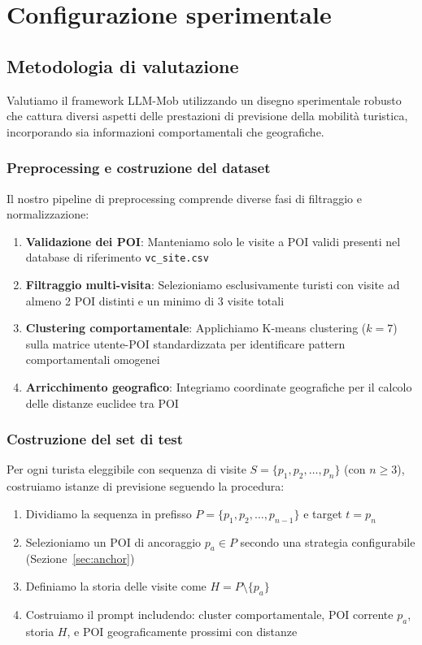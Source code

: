 \section{Configurazione sperimentale}

\subsection{Metodologia di valutazione}

Valutiamo il framework LLM-Mob utilizzando un disegno sperimentale robusto che cattura diversi aspetti delle prestazioni di previsione della mobilità turistica, incorporando sia informazioni comportamentali che geografiche.

\subsubsection{Preprocessing e costruzione del dataset}

Il nostro pipeline di preprocessing comprende diverse fasi di filtraggio e normalizzazione:

\begin{enumerate}
\item \textbf{Validazione dei POI}: Manteniamo solo le visite a POI validi presenti nel database di riferimento \texttt{vc\_site.csv}
\item \textbf{Filtraggio multi-visita}: Selezioniamo esclusivamente turisti con visite ad almeno 2 POI distinti e un minimo di 3 visite totali
\item \textbf{Clustering comportamentale}: Applichiamo K-means clustering ($k=7$) sulla matrice utente-POI standardizzata per identificare pattern comportamentali omogenei
\item \textbf{Arricchimento geografico}: Integriamo coordinate geografiche per il calcolo delle distanze euclidee tra POI
\end{enumerate}

\subsubsection{Costruzione del set di test}

Per ogni turista eleggibile con sequenza di visite $S = \{p_1, p_2, \ldots, p_n\}$ (con $n \geq 3$), costruiamo istanze di previsione seguendo la procedura:

\begin{enumerate}
\item Dividiamo la sequenza in prefisso $P = \{p_1, p_2, \ldots, p_{n-1}\}$ e target $t = p_n$
\item Selezioniamo un POI di ancoraggio $p_a \in P$ secondo una strategia configurabile (Sezione~\ref{sec:anchor})
\item Definiamo la storia delle visite come $H = P \setminus \{p_a\}$
\item Costruiamo il prompt includendo: cluster comportamentale, POI corrente $p_a$, storia $H$, e POI geograficamente prossimi con distanze
\end{enumerate}

